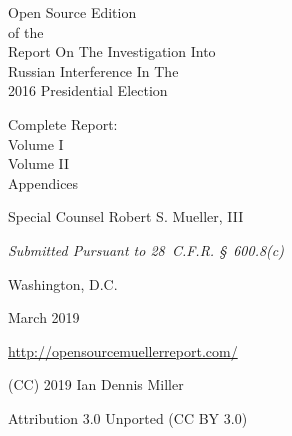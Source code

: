 \thispagestyle{empty}

\begin{center}
\Huge
Open Source Edition \\
of the \\
Report On The Investigation Into \\
Russian Interference In The \\
2016 Presidential Election

\vspace{10 mm}

\large
Complete Report:\\
Volume I\\
Volume II\\
Appendices

\vspace{10 mm}

Special Counsel Robert S. Mueller, III

\vspace{10 mm}

\normalsize

\textit{Submitted Pursuant to 28~C.F.R. \S~600.8(c)}

\vspace{20 mm}

Washington, D.C.

\vspace{10 mm}

March 2019

\vspace{10 mm}

\large
\url{http://opensourcemuellerreport.com/}

\vspace{10 mm}

\normalsize
(CC) 2019 Ian Dennis Miller

Attribution 3.0 Unported (CC BY 3.0)

\end{center}

\newpage
